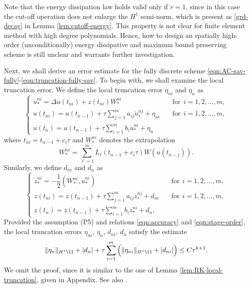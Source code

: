 \begin{remark}
Note that the energy dissipation law holds valid only if $r=1$,
since in this case the cut-off operation does not enlarge the $H^1$ semi-norm, which is present as \eqref{grd-decay} in Lemma \ref{lem:cutoff-energy}. This property is not clear for finite element method with high degree polynomials. Hence,
how to design an spatially high-order (unconditionally) energy dissipative and maximum bound preserving scheme
is still unclear and warrants further investigation.
\end{remark}


Next, we shall derive an error estimate for the fully discrete scheme \eqref{eqn:AC-sav-fully}-\eqref{eqn:truncation-fully-sav}.
To begin with, we shall examine the local truncation error. We define the local truncation error $\eta_{ni}$ and $\eta_{n}$  as
\begin{equation}\label{eqn:AC-sav-fully-trunc}
    \begin{cases}
    \dot u_*^{ni} = \Delta  u(t_{ni}) +  z(t_{ni}) W_*^{ni}&\quad \text{for} ~~i=1,2,\dots,m, \\ %
    u(t_{ni})=  u(t_{n-1}) + \tau \sum_{j=1}^m a_{ij} \dot u_*^{nj} + \eta_{ni}&\quad \text{for} ~~i=1,2,\dots,m, \\
    u(t_n) = u(t_{n-1}) + \tau \sum_{i=1}^m b_i \dot u_*^{ni} + \eta_{n}
  \end{cases}
\end{equation}
where $t_{ni}=t_{n-1}+c_i\tau$ and $W_*^{ni}$ denotes the extrapolation
$$ W_*^{ni} =  \sum_{\ell=1}^m L_{\ell}(t_{n-1}+c_i\tau) W(u(t_{n-j})). $$
Similarly, we define $d_{ni}$ and $d_{n}$ as
\begin{equation}\label{eqn:r-fully-trunc}
\begin{cases}
    \dot z_*^{ni} = - \dfrac12(W_*^{ni},   \dot u^{ni}_*) &\quad \text{for} ~~i=1,2,\dots,m, \\
    z(t_{ni}) = z(t_{n-1}) + \tau \sum_{j=1}^m a_{ij}  \dot z_*^{nj}+ d_{ni}&\quad \text{for} ~~i=1,2,\dots,m, \\
   z(t_{n}) = z(t_{n-1}) +  \tau \sum_{i=1}^m b_i  \dot z_*^{ni}+d_{n},
 \end{cases}
\end{equation}
Provided the assumption (P5) and relations \eqref{eqn:accuracy} and \eqref{eqn:stage-order},
the local truncation errors $\eta_{ni}$,   $\eta_{n}$,  $d_{ni}$, $d_n$ satisfy the estimate
\begin{equation}\label{eqn:trunc}
\| \eta_n \|_{H^1\II} + | d_n | + \tau \sum_{i=1}^m \Big(\| \eta_{ni} \|_{H^1\II} + |d_{ni}|\Big) \le C \tau^{k+1}.
\end{equation}
We omit the proof, since it is similar to the one of Lemma \ref{lem:RK-local-truncation}, given in Appendix.
See also \cite[Lemma 3.1]{akrivis2019energy}.

